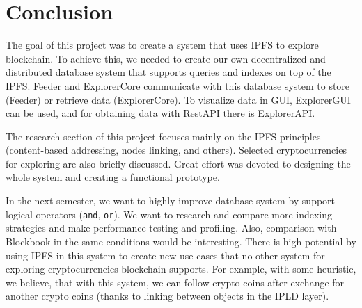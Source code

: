 \chapter{Conclusion}
\label{Conclusion}

The goal of this project was to create a system that uses IPFS to explore blockchain. To achieve this, we needed to create our own decentralized and distributed database system that supports queries and indexes on top of the IPFS. Feeder and ExplorerCore communicate with this database system to store (Feeder) or retrieve data (ExplorerCore). To visualize data in GUI, ExplorerGUI can be used, and for obtaining data with RestAPI there is ExplorerAPI.

The research section of this project focuses mainly on the IPFS principles (content-based addressing, nodes linking, and others). Selected cryptocurrencies for exploring are also briefly discussed. Great effort was devoted to designing the whole system and creating a functional prototype.

In the next semester, we want to highly improve database system by support logical operators (\texttt{and}, \texttt{or}). We want to research and compare more indexing strategies and make performance testing and profiling. Also, comparison with Blockbook in the same conditions would be interesting. There is high potential by using IPFS in this system to create new use cases that no other system for exploring cryptocurrencies blockchain supports. For example, with some heuristic, we believe, that with this system, we can follow crypto coins after exchange for another crypto coins (thanks to linking between objects in the IPLD layer).

